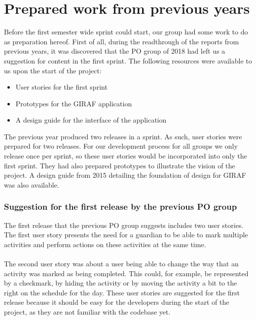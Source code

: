 \section{Prepared work from previous years}\label{prepared-work-from-previous-years}
Before the first semester wide sprint could start, our group had some work to do as preparation hereof.
First of all, during the readthrough of the reports from previous years, it was discovered that the PO group of 2018 had left us a suggestion for content in the first sprint.
The following resources were available to us upon the start of the project:
\begin{itemize}
    \item User stories for the first sprint
    \item Prototypes for the GIRAF application
    \item A design guide for the interface of the application
\end{itemize}
The previous year produced two releases in a sprint.
As such, user stories were prepared for two releases.
For our development process for all groups we only release once per sprint, so these user stories would be incorporated into only the first sprint.
They had also prepared prototypes to illustrate the vision of the project.
A design guide from 2015 detailing the foundation of design for GIRAF was also available. 

\subsubsection{Suggestion for the first release by the previous PO group}
The first release that the previous PO group suggests includes two user stories.
The first user story presents the need for a guardian to be able to mark multiple activities and perform actions on these activities at the same time.
\\\\
The second user story was about a user being able to change the way that an activity was marked as being completed.
This could, for example, be represented by a checkmark, by hiding the activity or by moving the activity a bit to the right on the schedule for the day.
These user stories are suggested for the first release because it should be easy for the developers during the start of the project, as they are not familiar with the codebase yet.

